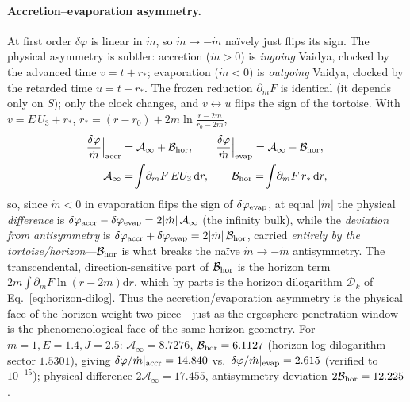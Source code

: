 \documentclass[
    aps, prd, twocolumn, superscriptaddress,
    showpacs, nofootinbib, floatfix
]{revtex4-2}
\newcommand{\dd}{\mathrm{d}}
\begin{document}
\paragraph{Accretion--evaporation asymmetry.} At first order $\delta\varphi$ is linear
in $\dot m$, so $\dot m\to-\dot m$ na\"ively just flips its sign. The physical
asymmetry is subtler: accretion ($\dot m>0$) is \emph{ingoing} Vaidya, clocked by the
advanced time $v=t+r_*$; evaporation ($\dot m<0$) is \emph{outgoing} Vaidya, clocked by
the retarded time $u=t-r_*$. The frozen reduction $\partial_m F$ is identical (it
depends only on $S$); only the clock changes, and $v\leftrightarrow u$ flips the sign
of the tortoise. With $v=E\,U_3+r_*$, $r_*=(r-r_0)+2m\ln\frac{r-2m}{r_0-2m}$,
\begin{equation}
\begin{aligned}
    \frac{\delta\varphi}{\dot m}\Big|_{\rm accr}&=\mathcal{A}_\infty+\mathcal{B}_{\rm hor},
    \qquad
    \frac{\delta\varphi}{\dot m}\Big|_{\rm evap}=\mathcal{A}_\infty-\mathcal{B}_{\rm hor},\\
    \mathcal{A}_\infty&=\!\int\!\partial_m F\,E U_3\,\dd r,
    \qquad
    \mathcal{B}_{\rm hor}=\!\int\!\partial_m F\,r_*\,\dd r,
\end{aligned}
    \label{eq:vaidya-asymmetry}
\end{equation}
so, since $\dot m<0$ in evaporation flips the sign of $\delta\varphi_{\rm evap}$, at equal
$|\dot m|$ the physical \emph{difference} is $\delta\varphi_{\rm accr}-\delta\varphi_{\rm evap}
=2|\dot m|\,\mathcal{A}_\infty$ (the infinity bulk), while the \emph{deviation from
antisymmetry} is $\delta\varphi_{\rm accr}+\delta\varphi_{\rm evap}=2|\dot m|\,\mathcal{B}_{\rm hor}$,
carried \emph{entirely by the tortoise/horizon}---$\mathcal{B}_{\rm hor}$ is what breaks the
na\"ive $\dot m\to-\dot m$ antisymmetry. The transcendental, direction-sensitive part of
$\mathcal{B}_{\rm hor}$ is the horizon term $2m\!\int\!\partial_m F\ln(r-2m)\dd r$,
which by parts is the horizon dilogarithm $\mathcal{D}_k$ of
Eq.~\eqref{eq:horizon-dilog}. Thus the accretion/evaporation asymmetry is the physical
face of the horizon weight-two piece---just as the ergosphere-penetration window is the
phenomenological face of the same horizon geometry. For $m=1,E=1.4,J=2.5$:
$\mathcal{A}_\infty=8.7276$, $\mathcal{B}_{\rm hor}=6.1127$ (horizon-log dilogarithm
sector $1.5301$), giving $\delta\varphi/\dot m|_{\rm accr}=14.840$ vs.\
$\delta\varphi/\dot m|_{\rm evap}=2.615$ (verified to $10^{-15}$); physical difference
$2\mathcal{A}_\infty=17.455$, antisymmetry deviation $2\mathcal{B}_{\rm hor}=12.225$.
\end{document}
